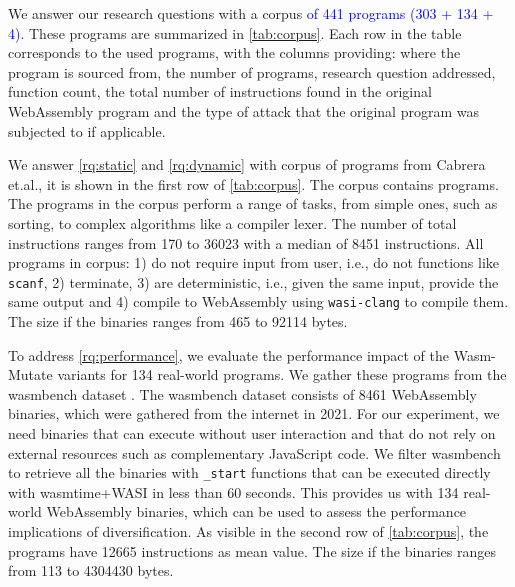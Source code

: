\documentclass[a4paper,fleqn]{cas-dc}
\newcommand{\tool}{{\sc Wasm-Mutate}\xspace}
\newcommand{\Wasm}{WebAssembly\xspace}
\newcommand{\wasm}{\Wasm}
\newcommand{\etal}{et.al.\xspace}
\newcommand{\ie}{i.e.,\xspace}
\newenvironment{revision1}{\color{blue}}{}
\newcommand{\revision}[1]{\textcolor{blue}{#1}}
\begin{document}


We answer our research questions with a corpus \revision{ of 441 programs (303 + 134 + 4).}
These programs are summarized in \autoref{tab:corpus}.
Each row in the table corresponds to the used programs, with the columns providing: where the program is sourced from, the number of programs, research question addressed, function count, the total number of instructions found in the original \wasm program and the type of attack that the original program was subjected to if applicable.

We answer \ref{rq:static} and \ref{rq:dynamic} with corpus of programs from Cabrera \etal \cite{arteaga2020crow}, it is shown in the first row of \autoref{tab:corpus}.
The corpus contains \nProgramsRosetta programs.
The programs in the corpus perform a range of tasks, from simple ones, such as sorting, to complex algorithms like a compiler lexer. 
The number of total instructions ranges from 170 to 36023 with a median of 8451 instructions.
All programs in corpus: 
1) do not require input from user, \ie do not  functions like \texttt{scanf}, 2) terminate, 3) are deterministic, \ie given the same input, provide the same output and 4) compile to \wasm using \texttt{wasi-clang} to compile them.
The size if the binaries ranges from 465 to 92114 bytes. 

\begin{revision1}
To address \ref{rq:performance}, we evaluate the performance impact of the \tool variants for 134 real-world programs. 
We gather these programs from the wasmbench dataset \cite{hilbig2021empirical}. 
The wasmbench dataset consists of 8461 \Wasm binaries, which were gathered from the internet in 2021. 
For our experiment, we need binaries that can execute without user interaction and that do not rely on external resources such as complementary JavaScript code. 
We filter wasmbench to retrieve all the binaries with \texttt{_start} functions that can be executed directly with wasmtime+WASI in less than 60 seconds. 
This provides us with  134 real-world \Wasm binaries, which can be used to assess the performance implications of diversification. 
As visible in the second row of \autoref{tab:corpus}, the programs have 12665 instructions as mean value.
The size if the binaries ranges from 113 to 4304430 bytes. 
\end{revision1}
\end{document}
